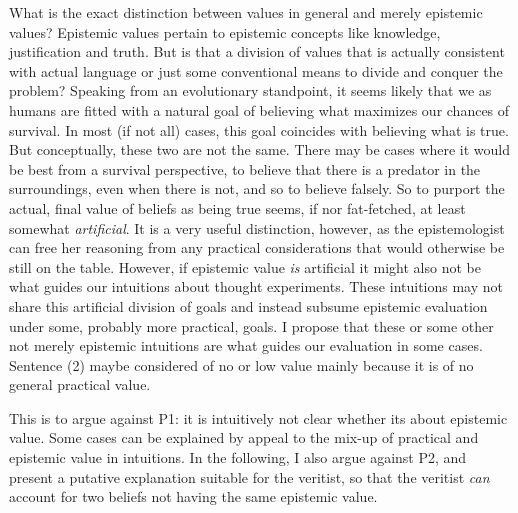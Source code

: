 \documentclass[12pt,numbers=noenddot]{scrartcl}
\begin{document}
What is the exact distinction between values in general and merely epistemic values? Epistemic values pertain to epistemic concepts like knowledge, justification and truth. But is that a division of values that is actually consistent with actual language or just some conventional means to divide and conquer the problem? Speaking from an evolutionary standpoint, it seems likely that we as humans are fitted with a natural goal of believing what maximizes our chances of survival. In most (if not all) cases, this goal coincides with believing what is true. But conceptually, these two are not the same. There may be cases where it would be best from a survival perspective, to believe that there is a predator in the surroundings, even when there is not, and so to believe falsely. So to purport the actual, final value of beliefs as being true seems, if nor fat-fetched, at least somewhat \emph{artificial}. It is a very useful distinction, however, as the epistemologist can free her reasoning from any practical considerations that would otherwise be still on the table. However, if epistemic value \emph{is} artificial it might also not be what guides our intuitions about thought experiments. These intuitions may not share this artificial division of goals and instead subsume epistemic evaluation under some, probably more practical, goals. I propose that these or some other not merely epistemic intuitions are what guides our evaluation in some cases. Sentence (2) maybe considered of no or low value mainly because it is of no general practical value.

This is to argue against P1: it is intuitively not clear whether its about epistemic value. Some cases can be explained by appeal to the mix-up of practical and epistemic value in intuitions.
In the following, I also argue against P2, and present a putative explanation suitable for the veritist, so that the veritist \emph{can} account for two beliefs not having the same epistemic value.
\end{document}
